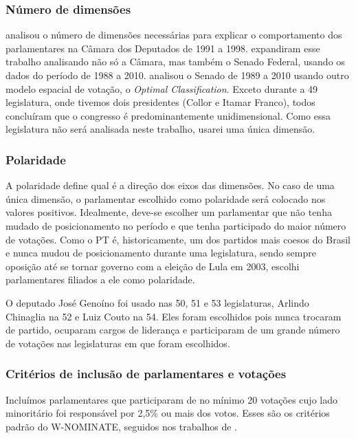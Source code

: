 \documentclass[a4paper,titlepage]{ppgi}\usepackage[]{graphicx}\usepackage[]{color}
\begin{document}
\subsubsection{Número de dimensões}

 analisou o número de dimensões necessárias para explicar
o comportamento dos parlamentares na Câmara dos Deputados de 1991 a 1998.
 expandiram esse trabalho analisando não só a Câmara,
mas também o Senado Federal, usando os dados do período de 1988 a 2010.
 analisou o Senado de 1989 a 2010 usando outro modelo
espacial de votação, o \emph{Optimal Classification}. Exceto durante a
49\textordfeminine{} legislatura, onde tivemos dois presidentes (Collor e
Itamar Franco), todos concluíram que o congresso é predominantemente
unidimensional. Como essa legislatura não será analisada neste trabalho, usarei
uma única dimensão.

\subsubsection{Polaridade}

A polaridade define qual é a direção dos eixos das dimensões. No caso de uma
única dimensão, o parlamentar escolhido como polaridade será colocado nos
valores positivos. Idealmente, deve-se escolher um parlamentar que não tenha
mudado de posicionamento no período e que tenha participado do maior número de
votações. Como o PT é, historicamente, um dos partidos mais coesos do Brasil e
nunca mudou de posicionamento durante uma legislatura, sendo sempre oposição
até se tornar governo com a eleição de Lula em 2003, escolhi parlamentares
filiados a ele como polaridade.

O deputado José Genoíno foi usado nas 50\textordfeminine{},
51\textordfeminine{} e 53\textordfeminine{} legislaturas, Arlindo Chinaglia na
52\textordfeminine{} e Luiz Couto na 54\textordfeminine{}. Eles foram
escolhidos pois nunca trocaram de partido, ocuparam cargos de liderança e
participaram de um grande número de votações nas legislaturas em que foram
escolhidos.

\subsubsection{Critérios de inclusão de parlamentares e votações}
\label{cap:desenvolvimento:criterios-de-inclusao}

Incluímos parlamentares que participaram de no mínimo 20 votações cujo lado
minoritário foi responsável por 2,5\% ou mais dos votos. Esses são os critérios
padrão do W-NOMINATE, seguidos nos trabalhos de
.
\end{document}
